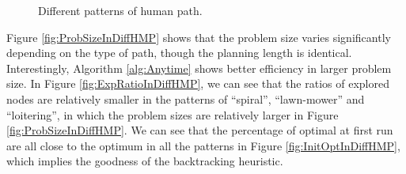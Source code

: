 \begin{figure} 
  \centering 
  \caption{Different patterns of human path.} 
  \label{fig:diffHMP}
\end{figure}

Figure \ref{fig:ProbSizeInDiffHMP} shows that the problem size varies significantly depending on the type of path, though the planning length is identical.
Interestingly, Algorithm \ref{alg:Anytime} shows better efficiency in larger problem size.
In Figure \ref{fig:ExpRatioInDiffHMP}, we can see that the ratios of explored nodes are relatively smaller in the patterns of ``spiral'', ``lawn-mower'' and ``loitering'', in which the problem sizes are relatively larger in Figure \ref{fig:ProbSizeInDiffHMP}.
We can see that the percentage of optimal at first run are all close to the optimum in all the patterns in Figure \ref{fig:InitOptInDiffHMP}, which implies the goodness of the backtracking heuristic.

